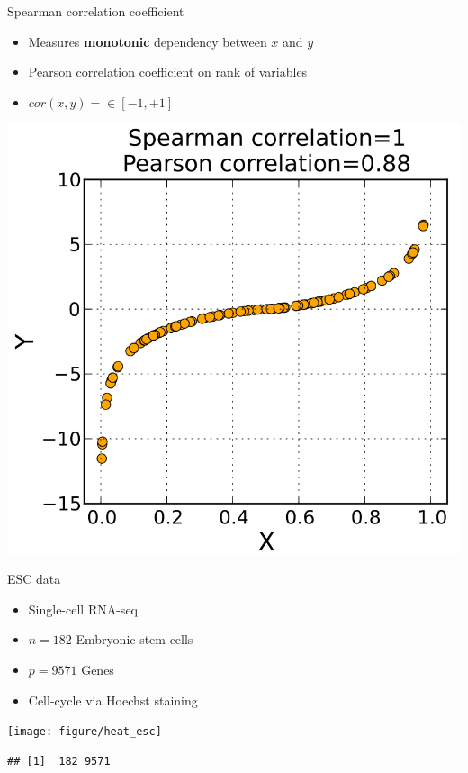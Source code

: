 \documentclass{beamer}\usepackage[]{graphicx}\usepackage[]{color}
\makeatletter
\newenvironment{kframe}{%
 \def\at@end@of@kframe{}%
 \ifinner\ifhmode%
  \def\at@end@of@kframe{\end{minipage}}%
  \begin{minipage}{\columnwidth}%
 \fi\fi%
 \def\FrameCommand##1{\hskip\@totalleftmargin \hskip-\fboxsep
 \colorbox{shadecolor}{##1}\hskip-\fboxsep
     \hskip-\linewidth \hskip-\@totalleftmargin \hskip\columnwidth}%
 \MakeFramed {\advance\hsize-\width
   \@totalleftmargin\z@ \linewidth\hsize
   \@setminipage}}%
 {\par\unskip\endMakeFramed%
 \at@end@of@kframe}
\newenvironment{knitrout}{}{} %
\makeatother
\begin{document}
\begin{frame}{Spearman correlation coefficient}
  \begin{itemize}
    \item Measures \textbf{monotonic} dependency between $x$ and $y$
    \item Pearson correlation coefficient on rank of variables
    \item $cor(x,y) = \in \left[-1,+1\right]$
  \end{itemize}
  \begin{center}
    \includegraphics[width=0.4\linewidth]{spearman.png}
  \end{center}
\end{frame}



\begin{frame}[fragile]{ESC data}
  \begin{itemize}
    \item Single-cell RNA-seq
    \item $n=182$ Embryonic stem cells
    \item $p=9571$ Genes
    \item Cell-cycle via Hoechst staining
  \end{itemize}
\begin{knitrout}\tiny
{}\color{fgcolor}

{\centering \texttt{[image: figure/heat\_esc]} 

}


\begin{kframe}\begin{verbatim}
## [1]  182 9571
\end{verbatim}
\end{kframe}
\end{knitrout}
\end{frame}
\end{document}
